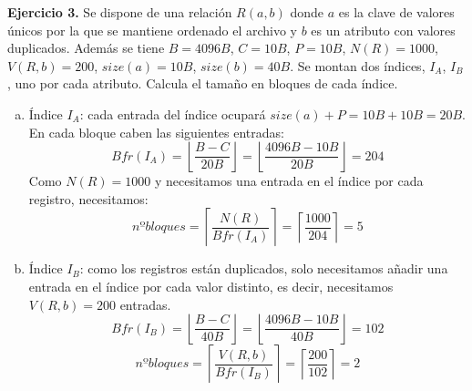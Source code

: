 \documentclass[12pt]{report}
\begin{document}
\textbf{Ejercicio 3.}  Se dispone de una relación $R(a,b)$ donde $a$ es la clave de valores únicos por la que se mantiene ordenado el archivo y $b$ es un atributo con valores duplicados. Además se tiene $B=4096B$, $C=10B$, $P=10B$, $N(R)=1000$, $V(R,b)=200$, $size(a)=10B$, $size(b)=40B$. Se montan dos índices, $I_A$, $I_B$, uno por cada atributo. Calcula el tamaño en bloques de cada índice.

\begin{enumerate}[(a)]
\item Índice $I_A$: cada entrada del índice ocupará $size(a)+P=10B+10B=20B$. En cada bloque caben las siguientes entradas:
\[
Bfr(I_A)=\left\lfloor\frac{B-C}{20B}\right\rfloor=\left\lfloor\frac{4096B-10B}{20B}\right\rfloor=204
\]
Como $N(R)=1000$ y necesitamos una entrada en el índice por cada registro, necesitamos:
\[
nºbloques=\left\lceil\frac{N(R)}{Bfr(I_A)}\right\rceil=\left\lceil\frac{1000}{204}\right\rceil=5
\]
\item Índice $I_B$: como los registros están duplicados, solo necesitamos añadir una entrada en el índice por cada valor distinto, es decir, necesitamos $V(R,b)=200$ entradas.
\[
Bfr(I_B)=\left\lfloor\frac{B-C}{40B}\right\rfloor=\left\lfloor\frac{4096B-10B}{40B}\right\rfloor=102
\]
\[
nºbloques=\left\lceil\frac{V(R,b)}{Bfr(I_B)}\right\rceil=\left\lceil\frac{200}{102}\right\rceil=2
\]
\end{enumerate}
\end{document}
